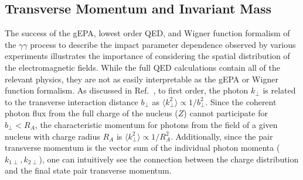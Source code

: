 \documentclass[twocolumn,epjc3]{svjour3}\sloppy
\begin{document}
\subsection{Transverse Momentum and Invariant Mass}
The success of the gEPA, lowest order QED, and Wigner function formalism of the $\gamma\gamma$ process to describe the impact parameter dependence observed by various experiments illustrates the importance of considering the spatial distribution of the electromagnetic fields. 
While the full QED calculations contain all of the relevant physics, they are not as easily interpretable as the gEPA or Wigner function formalism. 
As discussed in Ref.~\cite{kleinLeptonPairProduction2020a}, to first order, the photon $k_\perp$ is related to the transverse interaction distance $b_\perp$ as $\langle k_\perp^2 \rangle \propto 1/b_\perp^2$. 
Since the coherent photon flux from the full charge of the nucleus ($Z$) cannot participate for $b_\perp < R_A$, the characteristic momentum for photons from the field of a given nucleus with charge radius $R_A$ is $\langle k_\perp^2 \rangle \propto 1 / R_A^2$.
Additionally, since the pair transverse momentum is the vector sum of the individual photon momenta ($k_{1\perp}, k_{2\perp}$), one can intuitively see the connection between the charge distribution and the final state pair transverse momentum. 
\end{document}
